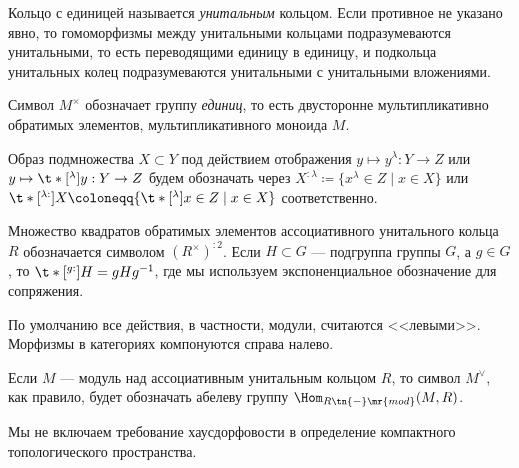 \documentclass[
	extrafontsizes,
	11pt,
	hyphens,
]{memoir}
\begin{document}
\begin{convention}
Кольцо с единицей называется \emph{унитальным} кольцом.
\label{con:UnitalRing}
Если противное не указано явно, то гомоморфизмы между унитальными кольцами подразумеваются унитальными,
то есть переводящими единицу в единицу,
и подкольца унитальных колец подразумеваются унитальными с унитальными вложениями.
\end{convention}

\begin{notation}
Символ \(M^\times\) обозначает группу \emph{единиц}, то есть двусторонне мультипликативно обратимых элементов, мультипликативного моноида \(M\).
\end{notation}

\begin{notation}
\label{not:im_exp_not}
Образ подмножества \(X \subset Y\) под действием
отображения
\(y \mapsto y^\lambda : Y \to Z\)
или
\(y \mapsto \t*[^{\lambda}]{y}{} : Y \to Z\)
будем обозначать через
\(X^{:\lambda} \coloneqq \{x^\lambda \in Z \mid x \in X\}\)
или
\(\t*[^{\lambda:}]{X}{} \coloneqq \{\t*[^{\lambda}]{x}{} \in Z \mid x \in X\}\)
соответственно.
\end{notation}

\begin{example}
Множество квадратов обратимых элементов ассоциативного унитального кольца \(R\) обозначается символом \((R^\times)^{:2}\).
Если \(H \subset G\) --- подгруппа группы \(G\), а \(g \in G\), то \(\t*[^{g:}]{H}{} = gHg^{-1}\), где мы используем экспоненциальное обозначение для сопряжения.
\end{example}

\begin{convention}
По умолчанию все действия, в частности, модули, считаются <<левыми>>.
Морфизмы в категориях компонуются справа налево.
\end{convention}

\begin{notation}
Если \(M\) --- модуль над ассоциативным унитальным кольцом \(R\), то символ
\(M^\vee\),
как правило, будет обозначать абелеву группу
\(\Hom_{R\tn{-}\mr{mod}}(M,R)\).
\end{notation}

\begin{convention}[\scshape Компактность и хаусдорфовость]
Мы не включаем требование хаусдорфовости в определение компактного топологического пространства.
\end{convention}
\end{document}
